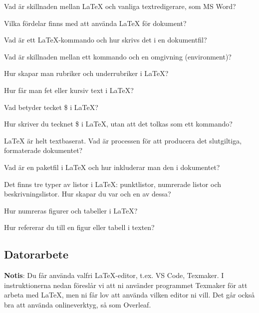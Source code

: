 \begin{Kontrollfragor}
	\item Vad är skillnaden mellan {\LaTeX} och vanliga textredigerare, som MS Word?
	\item Vilka fördelar finns med att använda {\LaTeX} för dokument?
	\item Vad är ett {\LaTeX}-kommando och hur skrivs det i en dokumentfil?
	\item Vad är skillnaden mellan ett kommando och en omgivning (environment)?
	\item Hur skapar man rubriker och underrubriker i {\LaTeX}?
	\item Hur får man fet eller kursiv text i {\LaTeX}?
	\item Vad betyder tecket \$ i {\LaTeX}?
	\item Hur skriver du tecknet \$ i {\LaTeX}, utan att det tolkas som ett kommando?
	\item {\LaTeX} är helt textbaserat. Vad är processen för att producera det slutgiltiga, formaterade dokumentet?
	\item Vad är en paketfil i {\LaTeX} och hur inkluderar man den i dokumentet?
	\item Det finns tre typer av listor i {\LaTeX}: punktlistor, numrerade listor och beskrivningslistor. Hur skapar du var och en av dessa?
	\item Hur numreras figurer och tabeller i {\LaTeX}?
	\item Hur refererar du till en figur eller tabell i texten?
\end{Kontrollfragor} 

\subsection{Datorarbete}

\textbf{Notis}: Du får använda valfri \LaTeX-editor, t.ex. VS Code, Texmaker. I instruktionerna nedan föreslår vi att ni använder programmet Texmaker för att arbeta med \LaTeX, men ni får lov att använda vilken editor ni vill. Det går också bra att använda onlineverktyg, så som Overleaf.

